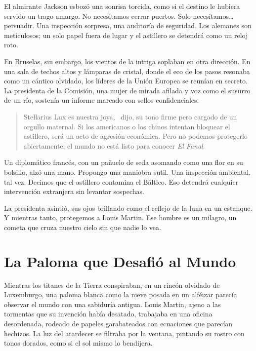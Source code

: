 El almirante Jackson esbozó una sonrisa torcida, como si el destino le hubiera servido un trago amargo. \glqq No necesitamos cerrar puertos. Solo necesitamos\ldots persuadir. Una inspección sorpresa, una auditoría de seguridad. Los alemanes son meticulosos; un solo papel fuera de lugar y el astillero se detendrá como un reloj roto.\grqq

En Bruselas, sin embargo, los vientos de la intriga soplaban en otra dirección. En una sala de techos altos y lámparas de cristal, donde el eco de los pasos resonaba como un cántico olvidado, los líderes de la Unión Europea se reunían en secreto. La presidenta de la Comisión, una mujer de mirada afilada y voz como el susurro de un río, sostenía un informe marcado con sellos confidenciales.

\begin{quote}
\calli
\glqq Stellarius Lux es nuestra joya,\grqq~ dijo, su tono firme pero cargado de un orgullo maternal. \glqq Si los americanos o los chinos intentan bloquear el astillero, será un acto de agresión económica. Pero no podemos protegerlo abiertamente; el mundo no está listo para conocer \emph{El Fanal}.\grqq
\end{quote}

Un diplomático francés, con un pañuelo de seda asomando como una flor en su bolsillo, alzó una mano. \glqq Propongo una maniobra sutil. Una inspección ambiental, tal vez. Decimos que el astillero contamina el Báltico. Eso detendrá cualquier intervención extranjera sin levantar sospechas.\grqq

La presidenta asintió, sus ojos brillando como el reflejo de la luna en un estanque. \glqq Y mientras tanto, protegemos a Louis Martin. Ese hombre es un milagro, un cometa que cruza nuestro cielo sin que nadie lo vea.\grqq

\section{La Paloma que Desafió al Mundo}

Mientras los titanes de la Tierra conspiraban, en un rincón olvidado de Luxemburgo, una paloma blanca como la nieve posada en un alféizar parecía observar el mundo con una sabiduría antigua. Louis Martin, ajeno a las tormentas que su invención había desatado, trabajaba en una oficina desordenada, rodeado de papeles garabateados con ecuaciones que parecían hechizos. La luz del atardecer se filtraba por la ventana, pintando su rostro con tonos dorados, como si el sol mismo lo bendijera.

